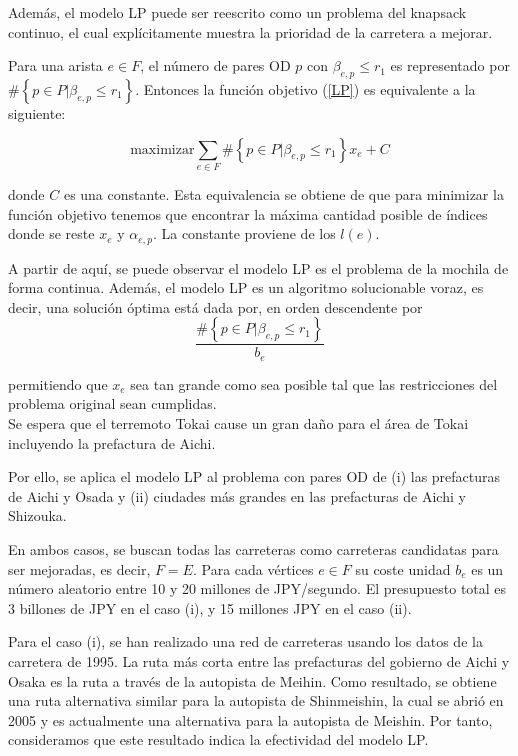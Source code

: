 \documentclass[10pt]{report}
\begin{document}
Además, el modelo LP puede ser reescrito como un problema del knapsack continuo, el cual explícitamente muestra la prioridad de la carretera a mejorar.

Para una arista $e \in F$, el número de pares OD $p$ con $\beta_{e,p} \leq r_{1}$ es representado por $\#\left\{ p \in P | \beta_{e,p} \leq r_{1} \right \}$. 
Entonces la función objetivo  (\ref{LP}) es equivalente a la siguiente:

$$
\text{maximizar} \sum_{e \in F} \#\left\{ p \in P | \beta_{e,p} \leq r_{1} \right\} x_{e} + C
$$

donde $C$ es una constante. Esta equivalencia se obtiene de que para minimizar la función objetivo tenemos que encontrar la máxima cantidad posible de índices donde se reste $x_e$ y $\alpha_{e,p}$. La constante proviene de los $l(e)$. 

A partir de aquí, se puede observar el modelo LP es el problema de la mochila de forma continua. Además, el modelo LP es un algoritmo solucionable voraz, es decir, una solución óptima está dada por, en orden descendente  por
$$
\frac{\#\left\{ p \in P | \beta_{e,p} \leq r_{1} \right\}}{b_{e}}
$$

permitiendo que $x_{e}$ sea tan grande como sea posible tal que las restricciones del problema original sean cumplidas.\\

Se espera que el terremoto Tokai cause un gran daño para el área de Tokai incluyendo la prefactura de Aichi.

Por ello, se aplica el modelo LP al problema con pares OD de (i) las prefacturas de Aichi y Osada y (ii)  ciudades más grandes en las prefacturas de Aichi y Shizouka.

En ambos casos, se buscan todas las carreteras como carreteras candidatas para ser mejoradas, es decir, $F=E$.
Para cada vértices $e \in F$ su coste unidad $b_{e}$ es un número aleatorio entre 10 y 20 millones de JPY/segundo. El presupuesto total es 3 billones de JPY en el caso (i), y 15 millones  JPY en el caso (ii).

Para el caso (i), se han realizado una red de carreteras usando los datos de la carretera de 1995. La ruta más corta entre las prefacturas  del gobierno de Aichi y Osaka es la ruta a través de la autopista de Meihin. Como resultado, se obtiene una ruta alternativa similar para la autopista de Shinmeishin, la cual se abrió en 2005 y es actualmente una alternativa para la autopista de Meishin.
Por tanto, consideramos que este resultado indica la efectividad del modelo LP.
\end{document}
